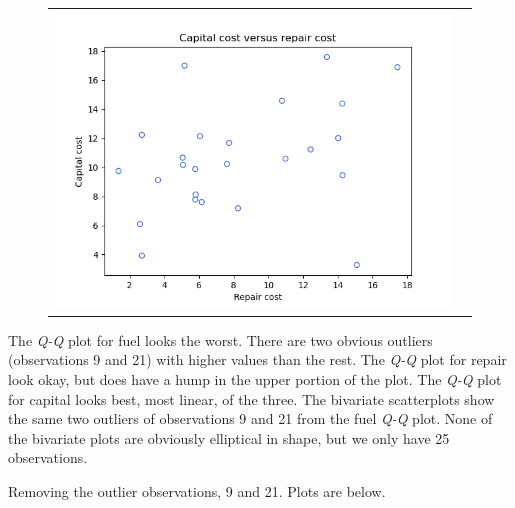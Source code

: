 \begin{enumerate}[label= (\alph*)]
\begin{figure}[H]
\begin{tabular}{cc}
            \includegraphics[scale=0.30]{./python/chapter-5/Question-5-22-a-xy-RepairCapital.png}
        \end{tabular}
    \end{figure}

    The \textit{Q-Q} plot for fuel looks the worst. There are two obvious outliers (observations 9 and 21) with higher values than the rest. The \textit{Q-Q} plot for repair look okay, but does have a hump in the upper portion of the plot. The \textit{Q-Q} plot for capital looks best, most linear, of the three. The bivariate scatterplots show the same two outliers of observations 9 and 21 from the fuel \textit{Q-Q} plot. None of the bivariate plots are obviously elliptical in shape, but we only have 25 observations.

    Removing the outlier observations, 9 and 21. Plots are below.


\end{enumerate}
